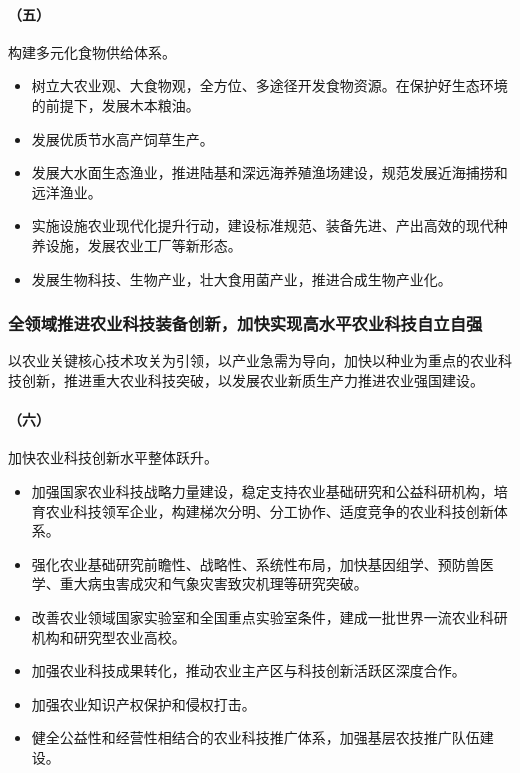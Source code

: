 \paragraph{（五）}构建多元化食物供给体系。

\begin{itemize}
    \item 树立大农业观、大食物观，全方位、多途径开发食物资源。在保护好生态环境的前提下，发展木本粮油。
    \item 发展优质节水高产饲草生产。
    \item 发展大水面生态渔业，推进陆基和深远海养殖渔场建设，规范发展近海捕捞和远洋渔业。
    \item 实施设施农业现代化提升行动，建设标准规范、装备先进、产出高效的现代种养设施，发展农业工厂等新形态。
    \item 发展生物科技、生物产业，壮大食用菌产业，推进合成生物产业化。
\end{itemize}

\subsubsection{全领域推进农业科技装备创新，加快实现高水平农业科技自立自强}

以农业关键核心技术攻关为引领，以产业急需为导向，加快以种业为重点的农业科技创新，推进重大农业科技突破，以发展农业新质生产力推进农业强国建设。

\paragraph{（六）}加快农业科技创新水平整体跃升。

\begin{itemize}
    \item 加强国家农业科技战略力量建设，稳定支持农业基础研究和公益科研机构，培育农业科技领军企业，构建梯次分明、分工协作、适度竞争的农业科技创新体系。
    \item 强化农业基础研究前瞻性、战略性、系统性布局，加快基因组学、预防兽医学、重大病虫害成灾和气象灾害致灾机理等研究突破。
    \item 改善农业领域国家实验室和全国重点实验室条件，建成一批世界一流农业科研机构和研究型农业高校。
    \item 加强农业科技成果转化，推动农业主产区与科技创新活跃区深度合作。
    \item 加强农业知识产权保护和侵权打击。
    \item 健全公益性和经营性相结合的农业科技推广体系，加强基层农技推广队伍建设。
\end{itemize}

